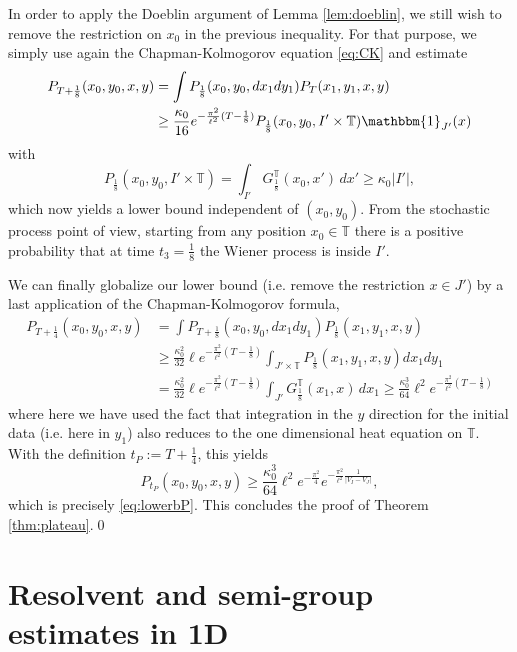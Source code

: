 \documentclass[12pt]{article}
\newcommand{\T}{\mathbb{T}}
\begin{document}
In order to apply the Doeblin argument of Lemma \ref{lem:doeblin}, we still 
wish to remove the restriction
on $x_0$ in the previous inequality. For that purpose, we simply use again
the Chapman-Kolmogorov equation \eqref{eq:CK} and estimate
\begin{equation*}\begin{split}
P_{T+\frac18}(x_0, y_0, x,y) &=  \int P_\frac18(x_0,y_0, dx_1dy_1)P_T(x_1,y_1,x,y)\\
&\geq \frac{\kappa_0}{16} e^{-\frac{\pi^2}{\ell^2}(T-\frac{1}{8})}
P_\frac18(x_0,y_0, I' \times \T) \mathbbm{1}_{J'}(x) 
\end{split}\end{equation*}
with 
$$
P_\frac18(x_0,y_0, I' \times \T) = \int_{I'} G_\frac18^\T(x_0, x')\, dx' \geq
\kappa_0|I'|,
$$
which now yields a lower bound independent of $(x_0, y_0)$. From the stochastic process 
point of view, starting from any position $x_0\in\mathbb{T}$ there is a positive 
probability that at time $t_3=\frac{1}{8}$ the Wiener process is inside $I'$.

We can finally globalize our lower bound (i.e. remove the restriction $x \in J'$) by
a last application of the Chapman-Kolmogorov formula,
\begin{equation*}\begin{split}
P_{T+\frac14}(x_0,y_0,x,y) &= \int P_{T+\frac18}(x_0,y_0, dx_1dy_1)P_\frac18(x_1,y_1,x,y)\\
	&\geq \frac{\kappa_0^2}{32} \ell e^{-\frac{\pi^2}{\ell^2}(T-\frac18)}\int_{J'\times
\T}P_\frac18(x_1,y_1,x,y) dx_1dy_1\\
	& =\frac{\kappa_0^2}{32} \ell e^{-\frac{\pi^2}{\ell^2}(T-\frac18)}
	\int_{J'}G_\frac18^\T(x_1,x)\, dx_1 \geq \frac{\kappa_0^3}{64}\ell^2
	e^{-\frac{\pi^2}{\ell^2}(T-\frac18)}
\end{split}\end{equation*}
where here we have used the fact that integration in the $y$ direction for the
initial data (i.e. here in $y_1$) also reduces to the one dimensional heat 
equation on $\T.$ With the definition $t_P := T + \frac14$, this yields  
$$
P_{t_P}(x_0,y_0,x,y) \geq \frac{\kappa_0^3}{64}\ell^2 e^{-\frac{\pi^2}{4}}
e^{-\frac{\pi^2}{\ell^2} \frac{1}{|V_I - V_J|}},
$$
which is precisely \eqref{eq:lowerbP}. This concludes the proof of 
Theorem \ref{thm:plateau}.\qed

\section{Resolvent and semi-group estimates in 1D}\label{sect:spectral}
\end{document}
